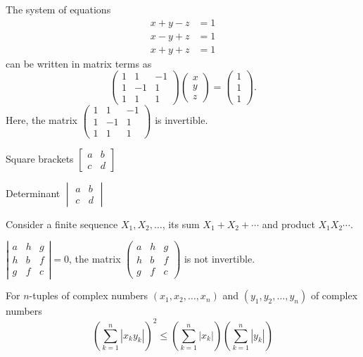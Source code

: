\documentclass{article}
\begin{document}
The system of equations
\begin{align*}
x+y-z & = 1\\
x-y+z & = 1\\
x+y+z & = 1
\end{align*}
can be written in matrix terms as
\begin{equation*}
\begin{pmatrix}
1 & 1 & -1\\
1 & -1 & 1\\
1 & 1 & 1
\end{pmatrix}
\begin{pmatrix}
x\\
y\\
z
\end{pmatrix}
=
\begin{pmatrix}
1\\
1\\
1
\end{pmatrix}.
\end{equation*}
Here, the matrix
$\begin{pmatrix}
1 & 1 & -1\\
1 & -1 & 1\\
1 & 1 & 1
\end{pmatrix}$
is invertible.


Square brackets
$
\begin{bmatrix}
a & b\\
c & d
\end{bmatrix}
$

Determinant
$
\begin{vmatrix}
a & b\\
c & d
\end{vmatrix}
$

Consider a finite sequence $X_1,X_2,\dotsc$, its sum $X_1+X_2+\dotsb$
and product $X_1X_2\dotsm$.

$
\left|\begin{smallmatrix}
a & h & g\\
h & b & f\\
g & f & c
\end{smallmatrix}\right|
=0
$,
the matrix
$
\left(\begin{smallmatrix}
a & h & g\\
h & b & f\\
g & f & c
\end{smallmatrix}\right)
$
is not invertible.

For $n$-tuples of complex numbers $(x_1,x_2,\dotsc,x_n)$ and
$(y_1,y_2,\dotsc,y_n)$ of complex numbers
\begin{equation*}
\left(\sum_{k=1}^n|x_ky_k|\right)^2\le
\left(\sum_{k=1}^{n}|x_k|\right)\left(\sum_{k=1}^{n}|y_k|\right)
\end{equation*}
\end{document}
